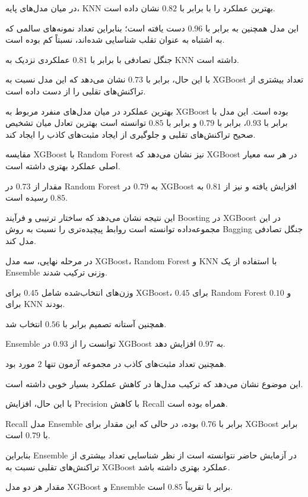 \documentclass[10pt,a4paper,twocolumn]{article}
\begin{document}
در میان مدل‌های پایه، KNN بهترین عملکرد را با
 برابر با $0.82$ نشان داده است.

این مدل همچنین به  برابر با $0.96$ دست یافته است؛
بنابراین تعداد نمونه‌های سالمی که به اشتباه به عنوان تقلب
شناسایی شده‌اند، نسبتاً کم بوده است.

جنگل تصادفی با  برابر با $0.81$ عملکردی نزدیک
به KNN داشته است.

با این حال،  برابر با $0.73$ نشان می‌دهد که این
مدل نسبت به XGBoost تعداد بیشتری از تراکنش‌های تقلبی را
از دست داده است.

بهترین عملکرد در میان مدل‌های منفرد مربوط به XGBoost بوده
است. این مدل با  برابر با $0.93$،
 برابر با $0.79$ و
 برابر با $0.85$ توانسته است بهترین تعادل
میان تشخیص صحیح تراکنش‌های تقلبی و جلوگیری از ایجاد
مثبت‌های کاذب را ایجاد کند.

مقایسه XGBoost با Random Forest نیز نشان می‌دهد که XGBoost
در هر سه معیار اصلی عملکرد بهتری داشته است.

مقدار  از $0.73$ در Random Forest به $0.79$ در
XGBoost افزایش یافته و  نیز از $0.81$ به $0.85$
رسیده است.

این نتیجه نشان می‌دهد که ساختار ترتیبی و فرآیند Boosting در
XGBoost در این مجموعه‌داده توانسته است روابط پیچیده‌تری را
نسبت به روش Bagging جنگل تصادفی مدل کند.

در مرحله نهایی، سه مدل XGBoost، Random Forest و KNN با
استفاده از یک Ensemble وزنی ترکیب شدند.

وزن‌های انتخاب‌شده شامل $0.45$ برای XGBoost،
$0.45$ برای Random Forest و $0.10$ برای KNN بودند.

همچنین آستانه تصمیم برابر با $0.56$ انتخاب شد.

Ensemble توانست  را از $0.93$ در XGBoost
به $0.97$ افزایش دهد.

همچنین تعداد مثبت‌های کاذب در مجموعه آزمون تنها $2$ مورد بود.

این موضوع نشان می‌دهد که ترکیب مدل‌ها در کاهش
 عملکرد بسیار خوبی داشته است.

با این حال، افزایش Precision با کاهش Recall همراه بوده است.

Recall مدل Ensemble برابر با $0.76$ بوده، در حالی که این
مقدار برای XGBoost برابر با $0.79$ است.

بنابراین Ensemble در آزمایش حاضر نتوانسته است از نظر
شناسایی تعداد بیشتری از تراکنش‌های تقلبی نسبت به XGBoost
عملکرد بهتری داشته باشد.

مقدار  هر دو مدل XGBoost و Ensemble برابر با
تقریباً $0.85$ است.
\end{document}
